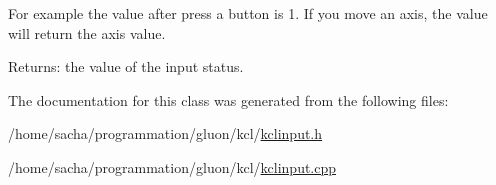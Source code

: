 For example the value after press a button is 1. If you move an axis, the value will return the axis value. \begin{Desc}
\item[Returns:]the value of the input status. \end{Desc}


The documentation for this class was generated from the following files:\begin{CompactItemize}
\item 
/home/sacha/programmation/gluon/kcl/\hyperlink{kclinput_8h}{kclinput.h}\item 
/home/sacha/programmation/gluon/kcl/\hyperlink{kclinput_8cpp}{kclinput.cpp}\end{CompactItemize}
